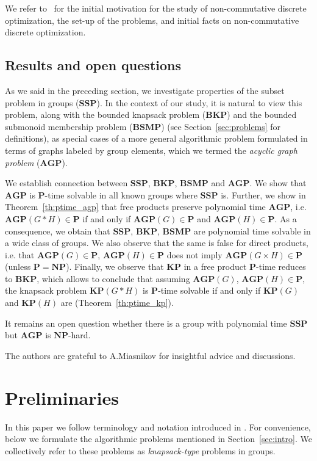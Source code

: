 \documentclass[10pt]{amsart}
\theoremstyle{definition}
\def\P{{\mathbf{P}}}
\def\NP{{\mathbf{NP}}}
\def\SSP{{\mathbf{SSP}}}
\def\BSMP{{\mathbf{BSMP}}}
\def\BKP{{\mathbf{BKP}}}
\def\KP{{\mathbf{KP}}}
\def\AGP{{\mathbf{AGP}}}
\begin{document}
We refer to~\cite{MNU1,MNU2} for the initial motivation for the study of non-commutative discrete optimization, the set-up of the problems, and initial facts on non-commutative discrete optimization.

\subsection{Results and open questions}\label{sub:results}
As we said in the preceding section, we investigate properties of the subset problem in groups ($\SSP$). In the context of our study, it is natural to view this problem, along with the bounded knapsack problem ($\BKP$) and the bounded submonoid membership problem ($\BSMP$) (see Section~\ref{sec:problems} for definitions), as special cases of a more general algorithmic problem formulated in terms of graphs labeled by group elements, which we termed the {\em acyclic graph problem} ($\AGP$).

We establish connection between $\SSP$, $\BKP$, $\BSMP$ and $\AGP$. We show that $\AGP$ is $\P$-time solvable in all known groups where $\SSP$ is. Further, we show in Theorem~\ref{th:ptime_agp} that free products preserve polynomial time $\AGP$, i.e. $\AGP(G* H)\in\P$ if and only if $\AGP(G)\in\P$ and $\AGP(H)\in\P$. As a consequence, we obtain that $\SSP$, $\BKP$, $\BSMP$ are polynomial time solvable in a wide class of groups. We also observe that the same is false for direct products, i.e. that $\AGP(G)\in\P$, $\AGP(H)\in\P$ does not imply $\AGP(G\times H)\in\P$ (unless $\P=\NP$). Finally, we observe that $\KP$ in a free product $\P$-time reduces to $\BKP$, which allows to conclude that assuming $\AGP(G)$, $\AGP(H)\in\P$, the knapsack problem $\KP(G*H)$ is $\P$-time solvable if and only if $\KP(G)$ and $\KP(H)$ are (Theorem~\ref{th:ptime_kp}).

It remains an open question whether there is a group with polynomial time $\SSP$ but $\AGP$ is $\NP$-hard.

The authors are grateful to A.Miasnikov for insightful advice and discussions.

\section{Preliminaries}\label{sec:prelim}\label{sec:problems}

In this paper we follow terminology and notation introduced in \cite{MNU1}. 
For convenience, below we formulate the algorithmic problems mentioned in Section~\ref{sec:intro}. We collectively refer to these problems as {\it knapsack-type} problems in groups.
\end{document}
